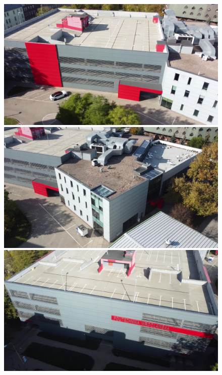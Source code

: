 \begin{figure}[h!]
    \centering
    \begin{minipage}{0.245\textwidth}
        \centering
        \includegraphics[width=\textwidth]{images/sks_dataset_1.jpg}
    \end{minipage}
    \hfill
    \begin{minipage}{0.245\textwidth}
        \centering
        \includegraphics[width=\textwidth]{images/sks_dataset_2.jpg}
    \end{minipage}
    \hfill
    \begin{minipage}{0.245\textwidth}
        \centering
        \includegraphics[width=\textwidth]{images/sks_dataset_3.jpg}

\end{minipage}
\end{figure}
